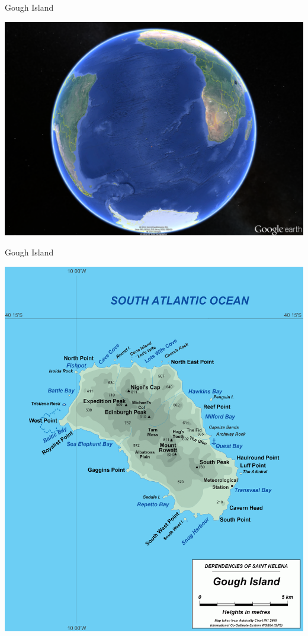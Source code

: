 \documentclass[12pt]{article}
\newcommand{\headsize}{\fontsize{35}{35} \selectfont}
\begin{document}
\newpage

\headsize \color{myyellow}
\hfill \begin{minipage}{5.75in}
\centering
Gough Island
\end{minipage}

\vspace{25mm}

\centerline{\includegraphics[height=0.8\textheight]{Figs/Gough_google_earth.png}}


\newpage

\addtocounter{page}{-1}

\headsize \color{myyellow}
\hfill \begin{minipage}{5.75in}
\centering
Gough Island
\end{minipage}

\vspace{25mm}

\centerline{\includegraphics[height=0.8\textheight]{Figs/Gough-Island-Map.png}}
\end{document}
